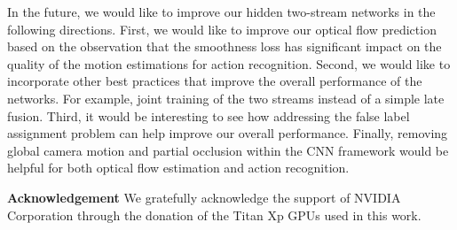 \documentclass[runningheads]{llncs}
\begin{document}
		In the future, we would like to improve our hidden two-stream networks in the following directions. First, we would like to improve our optical flow prediction based on the observation that the smoothness loss has significant impact on the quality of the motion estimations for action recognition. Second, we would like to incorporate other best practices that improve the overall performance of the networks. For example, joint training of the two streams instead of a simple late fusion. Third, it would be interesting to see how addressing the false label assignment problem can help improve our overall performance. Finally, removing global camera motion and partial occlusion within the CNN framework would be helpful for both optical flow estimation and action recognition. 
	
	\noindent \textbf{Acknowledgement} We gratefully acknowledge the support of NVIDIA Corporation through the donation of the Titan Xp GPUs used in this work.
	
		
	
\end{document}
